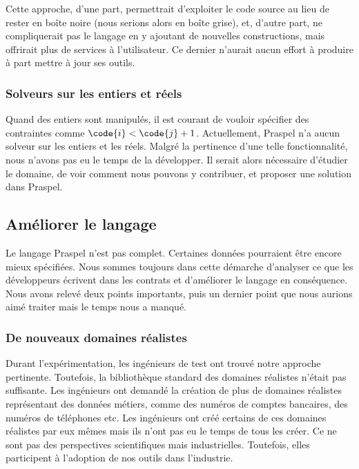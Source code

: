 Cette approche, d'une part, permettrait d'exploiter le code source au lieu de
rester en boîte noire (nous serions alors en boîte grise), et, d'autre part, ne
compliquerait pas le langage en y ajoutant de nouvelles constructions, mais
offrirait plus de services à l'utilisateur. Ce dernier n'aurait aucun effort à
produire à part mettre à jour ses outils.

\subsubsection{Solveurs sur les entiers et réels}

Quand des entiers sont manipulés, il est courant de vouloir spécifier des
contrain\-tes comme $\code{i} < \code{j} + 1$. Actuellement, Praspel n'a aucun
solveur sur les entiers et les réels. Malgré la pertinence d'une telle
fonctionnalité, nous n'avons pas eu le temps de la développer. Il serait alors
nécessaire d'étudier le domaine, de voir comment nous pouvons y contribuer, et
proposer une solution dans Praspel.

\subsection{Améliorer le langage}

Le langage Praspel n'est pas complet. Certaines données pourraient être encore
mieux spécifiées. Nous sommes toujours dans cette démarche d'analyser ce que les
développeurs écrivent dans les contrats et d'améliorer le langage en
conséquence. Nous avons relevé deux points importants, puis un dernier point que
nous aurions aimé traiter mais le temps nous a manqué.

\subsubsection{De nouveaux domaines réalistes}

Durant l'expérimentation, les ingénieurs de test ont trouvé notre approche
pertinente. Toutefois, la bibliothèque standard des domaines réalistes n'était
pas suffisante. Les ingénieurs ont demandé la création de plus de domaines
réalistes représentant des données métiers, comme des numéros de comptes
bancaires, des numéros de téléphones etc. Les ingénieurs ont créé certains de
ces domaines réalistes par eux mêmes mais ils n'ont pas eu le temps de tous les
créer. Ce ne sont pas des perspectives scientifiques mais industrielles.
Toutefois, elles participent à l'adoption de nos outils dans l'industrie.

